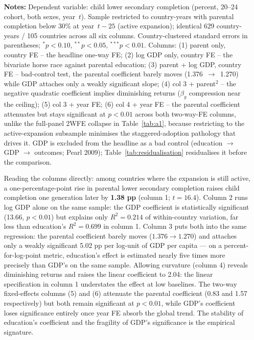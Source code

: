 \documentclass[12pt,letterpaper]{article}
\begin{document}
\begin{minipage}{\dimexpr\textwidth-2em}
\scriptsize
\textbf{Notes:} Dependent variable: child lower secondary completion
(percent, 20--24 cohort, both sexes, year~$t$). Sample restricted to
country-years with parental completion below 30\% at year~$t-25$
(active expansion); identical 629 country-years / 105 countries
across all six columns. Country-clustered standard errors in
parentheses; $^{*}p<0.10$, $^{**}p<0.05$, $^{***}p<0.01$. Columns:
(1) parent only, country FE -- the headline one-way FE; (2) log GDP
only, country FE -- the bivariate horse race against parental
education; (3) parent + log GDP, country FE -- bad-control test, the
parental coefficient barely moves
(1.376~$\rightarrow$~1.270) while GDP attaches only a weakly
significant slope; (4) col 3 + parent$^2$ -- the negative quadratic
coefficient implies diminishing returns ($\beta_g$ compression near
the ceiling); (5) col 3 + year FE; (6) col 4 + year FE -- the
parental coefficient attenuates but stays significant at $p<0.01$
across both two-way-FE columns, unlike the full-panel 2WFE collapse
in Table~\ref{tab:a1}, because restricting to the active-expansion
subsample minimises the staggered-adoption pathology that drives it.
GDP is excluded from the headline as a bad control (education
$\to$ GDP $\to$ outcomes; Pearl 2009); Table~\ref{tab:residualisation}
residualises it before the comparison.
\end{minipage}

Reading the columns directly: among countries where the expansion is
still active, a one-percentage-point rise in parental lower secondary
completion raises child completion one generation later by
\textbf{1.38 pp} (column 1; $t=16.4$). Column 2 runs log GDP alone on
the same sample: the GDP coefficient is statistically significant
(13.66, $p<0.01$) but explains only $R^2=0.214$ of within-country
variation, far less than education's $R^2=0.699$ in column 1. Column 3
puts both into the same regression: the parental coefficient barely
moves ($1.376 \rightarrow 1.270$) and attaches only a weakly
significant 5.02 pp per log-unit of GDP per capita --- on a
percent-for-log-point metric, education's effect is estimated nearly
five times more precisely than GDP's on the same sample. Allowing
curvature (column 4) reveals diminishing returns and raises the
linear coefficient to 2.04: the linear specification in column 1
understates the effect at low baselines. The two-way fixed-effects
columns (5) and (6) attenuate the parental coefficient (0.83 and
1.57 respectively) but both remain significant at $p<0.01$, while
GDP's coefficient loses significance entirely once year FE absorb
the global trend. The stability of education's coefficient and the
fragility of GDP's significance is the empirical signature.
\end{document}
